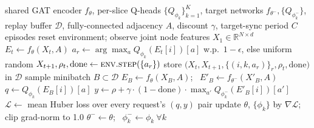 \documentclass[pdflatex,sn-basic,Numbered]{sn-jnl}%
\begin{document}
\begin{algorithm}[t]
\caption{GAT-CTDE: centralised training, decentralised execution}
\label{alg:gat-ctde}
\begin{algorithmic}[1]
\REQUIRE shared GAT encoder $f_\theta$, per-slice Q-heads $\{Q_{\phi_k}\}_{k=1}^{K}$, target networks $f_{\theta^-}, \{Q_{\phi_k^-}\}$, replay buffer $\mathcal{D}$, fully-connected adjacency $A$, discount $\gamma$, target-sync period $C$ episodes
  \STATE reset environment; observe joint node features $X_1 \in \mathbb{R}^{N \times d}$
    \STATE $E_t \gets f_\theta(X_t, A)$ 
      \STATE $a_r \gets \arg\max_a Q_{\phi_k}(E_t[i])[a]$ w.p.\ $1{-}\epsilon$, else uniform random 
    \ENDFOR
    \STATE $X_{t+1}, \rho_t, \text{done} \gets \textsc{env.step}(\{a_r\})$
    \STATE store $\big(X_t, X_{t+1}, \{(i,k,a_r)\}_r, \rho_t, \text{done}\big)$ in $\mathcal{D}$
      \STATE sample minibatch $B \subset \mathcal{D}$
      \STATE $E_B \gets f_\theta(X_B, A)$; \ $E'_B \gets f_{\theta^-}(X'_B, A)$ 
        \STATE $q \gets Q_{\phi_k}(E_B[i])[a]$
        \STATE $y \gets \rho + \gamma \cdot (1{-}\text{done}) \cdot \max_{a'} Q_{\phi_k^-}(E'_B[i])[a']$
      \ENDFOR
      \STATE $\mathcal{L} \gets$ mean Huber loss over every request's $(q, y)$ pair 
      \STATE update $\theta$, $\{\phi_k\}$ by $\nabla \mathcal{L}$; clip grad-norm to 1.0
    \ENDIF
  \ENDFOR
    \STATE $\theta^- \gets \theta$; \ $\phi_k^- \gets \phi_k\ \forall k$
  \ENDIF
\ENDFOR
\end{algorithmic}
\end{algorithm}
\end{document}
